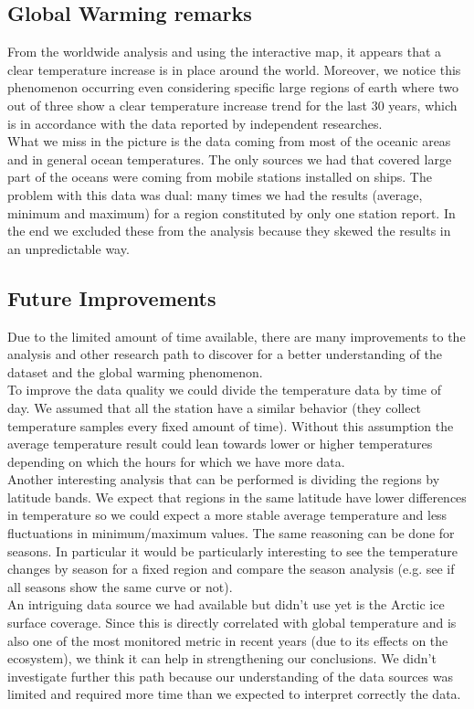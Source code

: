 \documentclass{vldb}
\begin{document}
\subsection{Global Warming remarks}
From the worldwide analysis and using the interactive map, it appears that a clear temperature increase is in place around the world. Moreover, we notice this phenomenon occurring even considering specific large regions of earth where two out of three show a clear temperature increase trend for the last 30 years, which is in accordance with the data reported by independent researches\cite{hansen2006global}. \\
What we miss in the picture is the data coming from most of the oceanic areas and in general ocean temperatures. The only sources we had that covered large part of the oceans were coming from mobile stations installed on ships. The problem with this data was dual: many times we had the results (average, minimum and maximum) for a region constituted by only one station report. In the end we excluded these from the analysis because they skewed the results in an unpredictable way.


\subsection{Future Improvements}
Due to the limited amount of time available, there are many improvements to the analysis and other research path to discover for a better understanding of the dataset and the global warming phenomenon. \\
To improve the data quality we could divide the temperature data by time of day. We assumed that all the station have a similar behavior (they collect temperature samples every fixed amount of time). Without this assumption the average temperature result could lean towards lower or higher temperatures depending on which the hours for which we have more data.\\
Another interesting analysis that can be performed is dividing the regions by latitude bands. We expect that regions in the same latitude have lower differences in temperature so we could expect a more stable average temperature and less fluctuations in minimum/maximum values. The same reasoning can be done for seasons. In particular it would be particularly interesting to see the temperature changes by season for a fixed region and compare the season analysis (e.g. see if all seasons show the same curve or not).\\ 
An intriguing data source we had available but didn't use yet is the Arctic ice surface coverage. Since this is directly correlated with global temperature and is also one of the most monitored metric in recent years (due to its effects on the ecosystem), we think it can help in strengthening our conclusions. We didn't investigate further this path because our understanding of the data sources was limited and required more time than we expected to interpret correctly the data.
\end{document}
